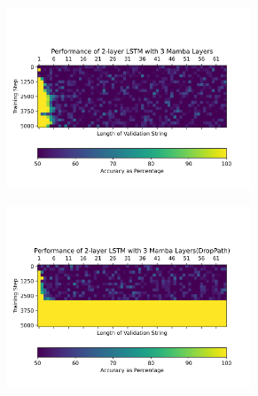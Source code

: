 \begin{figure}
\begin{subfigure}{0.5\textwidth}
\begin{center}
        \end{center}
    \end{subfigure}
    \begin{subfigure}{0.5\textwidth}
        \begin{center}
        \includegraphics[width=0.8\textwidth]{figures/parity_lstm_False_5_1.png}
        \end{center}
    \end{subfigure}\begin{subfigure}{0.5\textwidth}
        \begin{center}
        \includegraphics[width=0.8\textwidth]{figures/parity_lstm_True_5_1.png}
        \end{center}
    \end{subfigure}
    \begin{subfigure}{0.5\textwidth}
        \begin{center}

\end{center}
\end{subfigure}
\end{figure}

